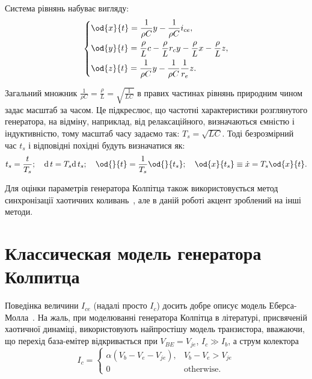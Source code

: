 Система рівнянь набуває вигляду:
%
\begin{equation}
\label{atu:eq:colp_phys2}
\begin{dcases}
  \od{x}{t}  = \dfrac{1}{\rho C}  y - \dfrac{1}{\rho C} i_{ce} , \\
  \od{y}{t}  = \dfrac{\rho}{L} c    - \dfrac{\rho}{L} r_c y - \dfrac{\rho}{L} x- \dfrac{\rho}{L} z, \\
  \od{z}{t}  = \dfrac{1}{\rho C}  y - \dfrac{1}{\rho C} \dfrac{1}{r_e} z.
\end{dcases}
\end{equation}

Загальний множник
$ \frac{1}{\rho C} = \frac{\rho}{L} = \sqrt{\frac{1}{LC}} $ в правих частинах рівнянь
природним чином задає масштаб за часом. Це підкреслює,
що частотні характеристики розглянутого генератора, на
відміну, наприклад, від релаксаційного, визначаються ємністю і
індуктивністю, тому масштаб часу задаємо так:
$ T_s = \sqrt{L C} $. Тоді безрозмірний час
$ t_s $ і відповідні похідні будуть визначатися як:
%
\[
  t_s = \frac{t}{T_s}; \quad
  \mathrm{d}\, t = T_s \mathrm{d}\, t_s; \quad
  \od{}{t}  = \frac{1}{T_s} \od{}{t_s}; \quad
  \od{x}{t_s} \equiv \dot{x} = T_s \od{x}{t} .
\]

Для оцінки параметрів генератора Колпітца також
використовується метод синхронізації хаотичних
коливань~\cite{PhysRevE.80.016201,picovskii_syncro,bonetti_super_persistent_colpitts}, але в даній
роботі акцент зроблений на інші методи.


\section{Классическая модель генератора Колпитца}  %

Поведінка величини
$ I_{ce} $ (надалі просто
$ I_c $) досить добре описує модель Еберса-Молла~\cite{horowitz}. На жаль,
при моделюванні генератора Колпітца в літературі, присвяченій
хаотичної динаміці, використовують найпростішу модель
транзистора, вважаючи, що перехід база-емітер відкривається при
$ V_{BE} = V_{je} $,
$ I_c \gg I_b $, а струм колектора
%
\begin{equation}
I_c =
  \begin{cases}
    \alpha ( V_b - V_e - V_{je} ), & V_b - V_e > V_{je} \\
    0                              & \text{otherwise}.
  \end{cases}
  \label{atu:eq:bjt_libear_model}
\end{equation}


